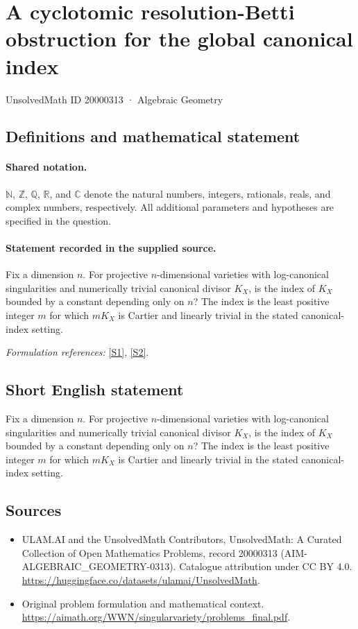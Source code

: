 \documentclass[11pt]{article}
\newcommand{\sref}[2]{\hyperlink{source:#1:#2}{[S#2]}}
\begin{document}
\setcounter{section}{20000312}
\section{A cyclotomic resolution-Betti obstruction for the global canonical index}\label{20000313}
{\small UnsolvedMath ID 20000313 · Algebraic Geometry}
\subsection{Definitions and mathematical statement}

\paragraph{Shared notation.}$\mathbb N$, $\mathbb Z$, $\mathbb Q$, $\mathbb R$, and $\mathbb C$ denote the natural numbers, integers, rationals, reals, and complex numbers, respectively. All additional parameters and hypotheses are specified in the question.


\paragraph{Statement recorded in the supplied source.}
Fix a dimension $n$. For projective $n$-dimensional varieties with log-canonical singularities and numerically trivial canonical divisor $K_X$, is the index of $K_X$ bounded by a constant depending only on $n$? The index is the least positive integer $m$ for which $mK_X$ is Cartier and linearly trivial in the stated canonical-index setting.
\par\smallskip\textit{Formulation references:} \sref{20000313}{1}, \sref{20000313}{2}.
\subsection{Short English statement}
Fix a dimension $n$. For projective $n$-dimensional varieties with log-canonical singularities and numerically trivial canonical divisor $K_X$, is the index of $K_X$ bounded by a constant depending only on $n$? The index is the least positive integer $m$ for which $mK_X$ is Cartier and linearly trivial in the stated canonical-index setting.
\subsection{Sources}
\begin{itemize}
\item[\hypertarget{source:20000313:1}{S1}] ULAM.AI and the UnsolvedMath Contributors, UnsolvedMath: A Curated Collection of Open Mathematics Problems, record 20000313 (AIM-ALGEBRAIC\_GEOMETRY-0313). Catalogue attribution under CC BY 4.0.
\url{https://huggingface.co/datasets/ulamai/UnsolvedMath}.
\item[\hypertarget{source:20000313:2}{S2}] Original problem formulation and mathematical context.
\url{https://aimath.org/WWN/singularvariety/problems_final.pdf}.
\end{itemize}
\label{end:20000313}
\end{document}
